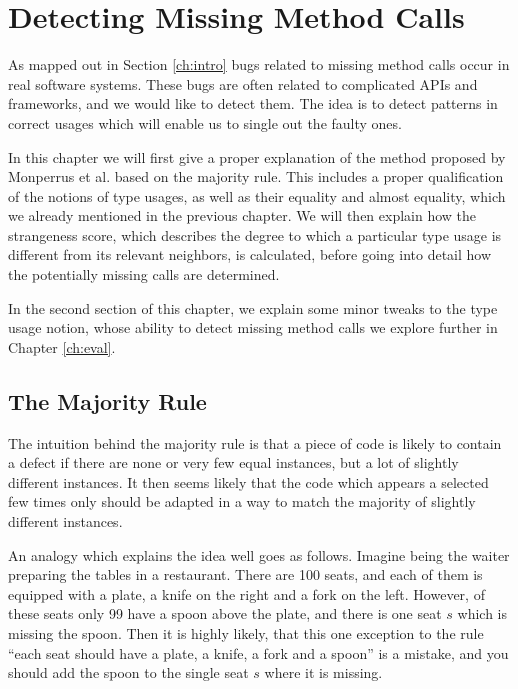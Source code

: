 \chapter{Detecting Missing Method Calls}\label{ch:dmmc}
As mapped out in Section \ref{ch:intro} bugs related to missing method calls occur in real software systems.
These bugs are often related to complicated APIs and frameworks, and we would like to detect them.
The idea is to detect patterns in correct usages which will enable us to single out the faulty ones.

In this chapter we will first give a proper explanation of the method proposed by Monperrus et al. \cite{monperrus2010detecting}\cite{monperrus2013detecting} based on the majority rule.
This includes a proper qualification of the notions of type usages, as well as their equality and almost equality, which we already mentioned in the previous chapter.
We will then explain how the strangeness score, which describes the degree to which a particular type usage is different from its relevant neighbors, is calculated, before going into detail how the potentially missing calls are determined.

In the second section of this chapter, we explain some minor tweaks to the type usage notion, whose ability to detect missing method calls we explore further in Chapter \ref{ch:eval}.

\section{The Majority Rule}

The intuition behind the majority rule is that a piece of code is likely to contain a defect if there are none or very few equal instances, but a lot of slightly different instances.
It then seems likely that the code which appears a selected few times only should be adapted in a way to match the majority of slightly different instances.

An analogy which explains the idea well goes as follows.
Imagine being the waiter preparing the tables in a restaurant.
There are 100 seats, and each of them is equipped with a plate, a knife on the right and a fork on the left.
However, of these seats only 99 have a spoon above the plate, and there is one seat $s$ which is missing the spoon.
Then it is highly likely, that this one exception to the rule ``each seat should have a plate, a knife, a fork and a spoon'' is a mistake, and you should add the spoon to the single seat $s$ where it is missing.


